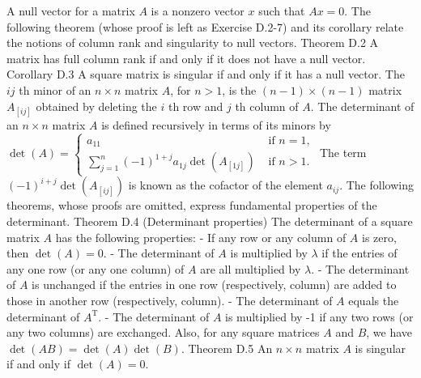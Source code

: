\documentclass[lang=cn,newtx,10pt,scheme=chinese]{elegantbook}
\begin{document}
A null vector for a matrix $A$ is a nonzero vector $x$ such that $A x=0$. The following theorem (whose proof is left as Exercise D.2-7) and its corollary relate the notions of column rank and singularity to null vectors.
Theorem D.2
A matrix has full column rank if and only if it does not have a null vector.
Corollary D.3
A square matrix is singular if and only if it has a null vector.
The $i j$ th minor of an $n \times n$ matrix $A$, for $n>1$, is the $(n-1) \times(n-1)$ matrix $A_{[i j]}$ obtained by deleting the $i$ th row and $j$ th column of $A$. The determinant of an $n \times n$ matrix $A$ is defined recursively in terms of its minors by
$\operatorname{det}(A)= \begin{cases}a_{11} & \text { if } n=1, \\ \sum_{j=1}^n(-1)^{1+j} a_{1 j} \operatorname{det}\left(A_{[1 j]}\right) & \text { if } n>1 .\end{cases}$
The term $(-1)^{i+j} \operatorname{det}\left(A_{[i j]}\right)$ is known as the cofactor of the element $a_{i j}$.
The following theorems, whose proofs are omitted, express fundamental properties of the determinant.
Theorem D.4 (Determinant properties)
The determinant of a square matrix $A$ has the following properties:
- If any row or any column of $A$ is zero, then $\operatorname{det}(A)=0$.
- The determinant of $A$ is multiplied by $\lambda$ if the entries of any one row (or any one column) of $A$ are all multiplied by $\lambda$.
- The determinant of $A$ is unchanged if the entries in one row (respectively, column) are added to those in another row (respectively, column).
- The determinant of $A$ equals the determinant of $A^{\mathrm{T}}$.
- The determinant of $A$ is multiplied by -1 if any two rows (or any two columns) are exchanged.
Also, for any square matrices $A$ and $B$, we have $\operatorname{det}(A B)=\operatorname{det}(A) \operatorname{det}(B)$.
Theorem D.5
An $n \times n$ matrix $A$ is singular if and only if $\operatorname{det}(A)=0$.
\end{document}
